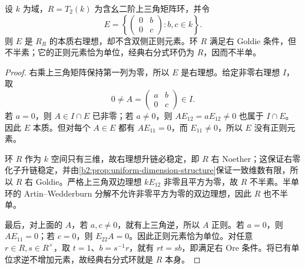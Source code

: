 \begin{proposition}\label{b2:prop:essential-without-semiprime}
	设 \(k\) 为域，\(R=T_2(k)\) 为含幺二阶上三角矩阵环，并令
	\[
		E=\left\{\begin{pmatrix}0&b\\0&c\end{pmatrix}:b,c\in k\right\}.
	\]
	则 \(E\) 是 \(R_R\) 的本质右理想，却不含双侧正则元素。环 \(R\) 满足右 Goldie 条件，但不半素；它的正则元素恰为单位，经典右分式环仍为 \(R\)，因而不半单。
\end{proposition}
\begin{proof}
	右乘上三角矩阵保持第一列为零，所以 \(E\) 是右理想。给定非零右理想 \(I\)，取
	\[
		0\ne A=\begin{pmatrix}a&b\\0&c\end{pmatrix}\in I.
	\]
	若 \(a=0\)，则 \(A\in I\cap E\) 已非零；若 \(a\ne0\)，则 \(AE_{12}=aE_{12}\ne0\) 也属于 \(I\cap E\)。因此 \(E\) 本质。但对每个 \(A\in E\) 都有 \(AE_{11}=0\)，而 \(E_{11}\ne0\)，所以 \(E\) 没有正则元素。

	环 \(R\) 作为 \(k\) 空间只有三维，故右理想升链必稳定，即 \(R\) 右 Noether；这保证右零化子升链稳定，并由\cref{b2:prop:uniform-dimension-structure}保证一致维数有限，所以 \(R\) 右 Goldie。严格上三角双边理想 \(kE_{12}\) 非零且平方为零，故 \(R\) 不半素。半单环的 Artin--Wedderburn 分解不允许非零平方为零的双边理想，因此 \(R\) 也不半单。

	最后，对上面的 \(A\)，若 \(a,c\ne0\)，就有上三角逆，所以 \(A\) 正则。若 \(a=0\)，则 \(AE_{11}=0\)；若 \(c=0\)，则 \(E_{22}A=0\)。因此正则元素恰为单位。对任意 \(r\in R,s\in R^\times\)，取 \(t=1\)、\(b=s^{-1}r\)，就有 \(rt=sb\)，即满足右 Ore 条件。将已有单位求逆不增加元素，故经典右分式环就是 \(R\) 本身。
\end{proof}
